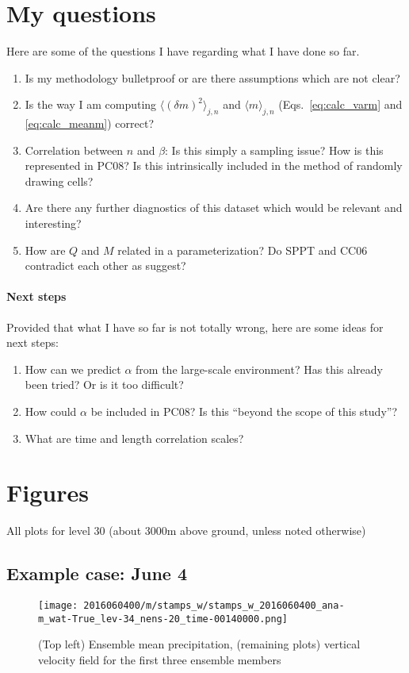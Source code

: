 \documentclass[a4paper, 12pt]{article}
\begin{document}
\section{My questions}
Here are some of the questions I have regarding what I have done so far.
\begin{enumerate}
 \item Is my methodology bulletproof or are there assumptions which are not clear?
 \item Is the way I am computing $\langle (\delta m )^2 \rangle_{j,n}$ and $\langle m \rangle_{j,n}$ (Eqs.~\ref{eq:calc_varm} and \ref{eq:calc_meanm}) correct? 
 \item Correlation between $n$ and $\beta$: Is this simply a sampling issue? How is this represented in PC08? Is this intrinsically included in the method of randomly drawing cells?
 \item Are there any further diagnostics of this dataset which would be relevant and interesting?
 \item How are $Q$ and $M$ related in a parameterization? Do SPPT and CC06 contradict each other as \cite{Shutts2007} suggest?
\end{enumerate}

\paragraph{Next steps} Provided that what I have so far is not totally wrong, here are some ideas for next steps:
\begin{enumerate}
 \item How can we predict $\alpha$ from the large-scale environment? Has this already been tried? Or is it too difficult?
 \item How could $\alpha$ be included in PC08? Is this ``beyond the scope of this study''?
 \item What are time and length correlation scales? 
\end{enumerate}



\newpage

{\small
 }

\newpage
\section{Figures}
All plots for level 30 (about 3000m above ground, unless noted otherwise)

\subsection{Example case: June 4}
\begin{figure}[ht]
\noindent \centering
\texttt{[image: 2016060400/m/stamps\_w/stamps\_w\_2016060400\_ana-m\_wat-True\_lev-34\_nens-20\_time-00140000.png]}\\
\caption{(Top left) Ensemble mean precipitation, (remaining plots) vertical velocity field for the first three ensemble members} \label{fig:ex_stamps_w}
\end{figure}
\end{document}

